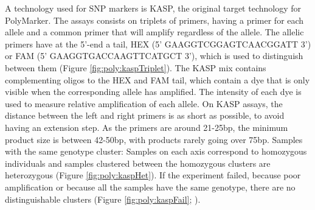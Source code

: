 A technology used for SNP markers is KASP, the original target technology for PolyMarker. 
The assays consists on triplets of primers, having a primer for each allele and a common primer that will amplify regardless of the allele. 
The allelic primers have at the 5'-end a tail, HEX (5' GAAGGTCGGAGTCAACGGATT 3') or FAM (5' GAAGGTGACCAAGTTCATGCT 3'), which is used to distinguish between them (Figure \ref{fig:poly:kaspTriplet}). 
The KASP mix contains complementing oligos to the HEX and FAM tail, which contain a dye that is only visible when the corresponding allele has amplified. 
The intensity of each dye is used to measure relative amplification of each allele. 
On KASP assays, the distance between the left and right primers is as short as possible, to avoid having an extension step. 
As the primers are around 21-25bp, the minimum product size is between 42-50bp, with products rarely going over 75bp.  
Samples with the same genotype cluster: Samples on each axis correspond to homozygous individuals and samples clustered between the homozygous clusters are heterozygous (Figure \ref{fig:poly:kaspHet}). 
If the experiment failed, because poor amplification or because all the samples have the same genotype, there are no distinguishable clusters (Figure \ref{fig:poly:kaspFail}; \citealt{LGC}).


